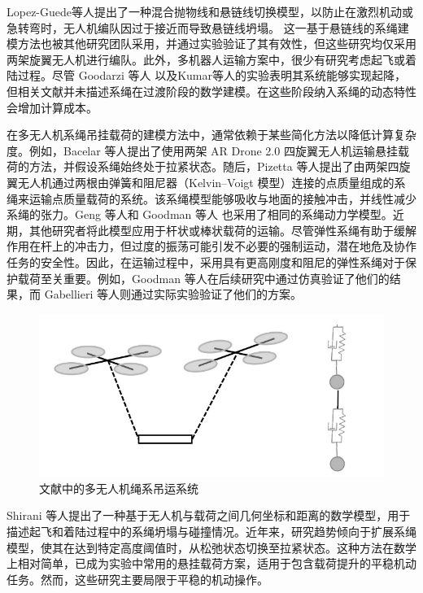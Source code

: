 \documentclass[lang=chs, degree=master, blindreview=false, winfonts=true]{yanputhesis}
\begin{document}
Lopez-Guede等人提出了一种混合抛物线和悬链线切换模型，以防止在激烈机动或急转弯时，无人机编队因过于接近而导致悬链线坍塌\cite{estevez2022hybrid}。
这一基于悬链线的系绳建模方法也被其他研究团队采用，并通过实验验证了其有效性\cite{d2021catenary,abhishek2021towards}，但这些研究均仅采用两架旋翼无人机进行编队。此外，多机器人运输方案中，很少有研究考虑起飞或着陆过程。尽管 Goodarzi 等人\cite{goodarzi2015dynamics} 以及Kumar等人\cite{michael2011cooperative}的实验表明其系统能够实现起降，但相关文献并未描述系绳在过渡阶段的数学建模。在这些阶段纳入系绳的动态特性会增加计算成本。

在多无人机系绳吊挂载荷的建模方法中，通常依赖于某些简化方法以降低计算复杂度。例如，Bacelar 等人提出了使用两架 AR Drone 2.0 四旋翼无人机运输悬挂载荷的方法，并假设系绳始终处于拉紧状态\cite{bacelar2020board}。随后，Pizetta 等人提出了由两架四旋翼无人机通过两根由弹簧和阻尼器（Kelvin–Voigt 模型）连接的点质量组成的系绳来运输点质量载荷的系统\cite{doakhan2023cooperative,doakhan2023robust}。该系绳模型能够吸收与地面的接触冲击，并线性减少系绳的张力。Geng 等人\cite{geng2020cooperative}和 Goodman 等人\cite{goodman2023geometric} 也采用了相同的系绳动力学模型。近期，其他研究者将此模型应用于杆状或棒状载荷的运输。尽管弹性系绳有助于缓解作用在杆上的冲击力，但过度的振荡可能引发不必要的强制运动，潜在地危及协作任务的安全性。因此，在运输过程中，采用具有更高刚度和阻尼的弹性系绳对于保护载荷至关重要。例如，Goodman 等人在后续研究中通过仿真验证了他们的结果\cite{goodman2022geometric}，而 Gabellieri 等人则通过实际实验验证了他们的方案\cite{gabellieri2023equilibria}。

\begin{figure}[hbt!]
	\centering
	\includegraphics[width=28pc]{picture/1_8.png} 
	\caption{文献中的多无人机绳系吊运系统} \label{1_8}
\end{figure}
Shirani 等人提出了一种基于无人机与载荷之间几何坐标和距离的数学模型，用于描述起飞和着陆过程中的系绳坍塌与碰撞情况\cite{shirani2019cooperative}。近年来，研究趋势倾向于扩展系绳模型，使其在达到特定高度阈值时，从松弛状态切换至拉紧状态\cite{rao2023integrated,arab2022cooperative,doakhan2023robust,mohammadi2021passivity}。这种方法在数学上相对简单，已成为实验中常用的悬挂载荷方案，适用于包含载荷提升的平稳机动任务。然而，这些研究主要局限于平稳的机动操作。
\end{document}
